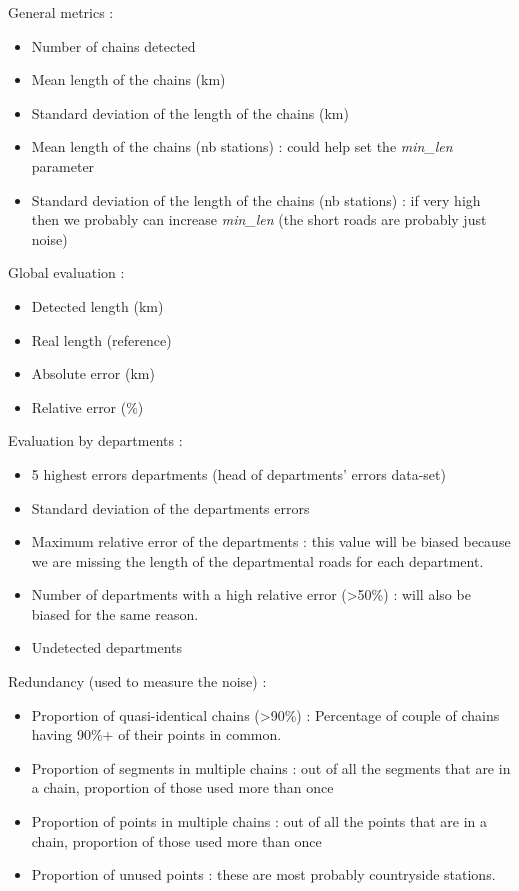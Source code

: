 \documentclass[main.tex]{subfiles}
\begin{document}
General metrics :
\begin{itemize}
    \item Number of chains detected
    \item Mean length of the chains (km)
    \item Standard deviation of the length of the chains (km)
    \item Mean length of the chains (nb stations) : could help set the \textit{min\_len} parameter
    \item Standard deviation of the length of the chains (nb stations) : if very high then we probably can increase \textit{min\_len} (the short roads are probably just noise)
\end{itemize}
Global evaluation :
\begin{itemize}
    \item Detected length (km)
    \item Real length (reference)
    \item Absolute error (km)
    \item Relative error (\%)
\end{itemize}
Evaluation by departments : 
\begin{itemize}
    \item 5 highest errors departments (head of departments' errors data-set)
    \item Standard deviation of the departments errors 
    \item Maximum relative error of the departments : this value will be biased because we are missing the length of the departmental roads for each department.
    \item Number of departments with a high relative error (>50\%) : will also be biased for the same reason.
    \item Undetected departments
\end{itemize}
Redundancy (used to measure the noise) :
\begin{itemize}
    \item Proportion of quasi-identical chains (>90\%) : Percentage of couple of chains having 90\%+ of their points in common. 
    \item Proportion of segments in multiple chains : out of all the segments that are in a chain, proportion of those used more than once
    \item Proportion of points in multiple chains : out of all the points that are in a chain, proportion of those used more than once
    \item Proportion of unused points : these are most probably countryside stations.
\end{itemize}
\end{document}
